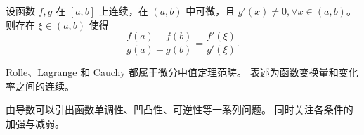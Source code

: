\begin{note}[Cauchy]
    设函数 $f, g$ 在 $[a, b]$ 上连续，在 $(a, b)$ 中可微，且 $g'(x) \neq 0, \forall x \in (a, b)$。
    则存在 $\xi \in (a, b)$ 使得
    \begin{equation*}
        \frac{f(a) - f(b)}{g(a) - g(b)} = \frac{f'(\xi)}{g'(\xi)}.
    \end{equation*}
\end{note}

\begin{note}
    Rolle、Lagrange 和 Cauchy 都属于微分中值定理范畴。
    表述为函数变换量和变化率之间的连续。
\end{note}

\begin{note}
    由导数可以引出函数单调性、凹凸性、可逆性等一系列问题。
    同时关注各条件的加强与减弱。
\end{note}